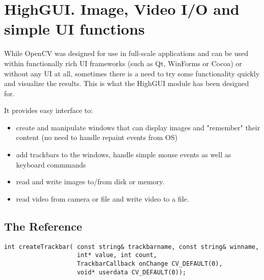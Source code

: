 \section{HighGUI. Image, Video I/O and simple UI functions}

While OpenCV was designed for use in full-scale
applications and can be used within functionally rich UI frameworks (such as Qt, WinForms or Cocoa) or without any UI at all, sometimes there is a need to try some functionality quickly and visualize the results. This is what the HighGUI module has been designed for.

It provides easy interface to:
\begin{itemize}
    \item create and manipulate windows that can display images and "remember" their content (no need to handle repaint events from OS)
    \item add trackbars to the windows, handle simple mouse events as well as keyboard commmands
    \item read and write images to/from disk or memory.
    \item read video from camera or file and write video to a file.
\end{itemize}

\subsection{The Reference}

\label{createTrackbar}

\begin{lstlisting}
int createTrackbar( const string& trackbarname, const string& winname,
                    int* value, int count,
                    TrackbarCallback onChange CV_DEFAULT(0),
                    void* userdata CV_DEFAULT(0));
\end{lstlisting}
\begin{description}
\end{description}

